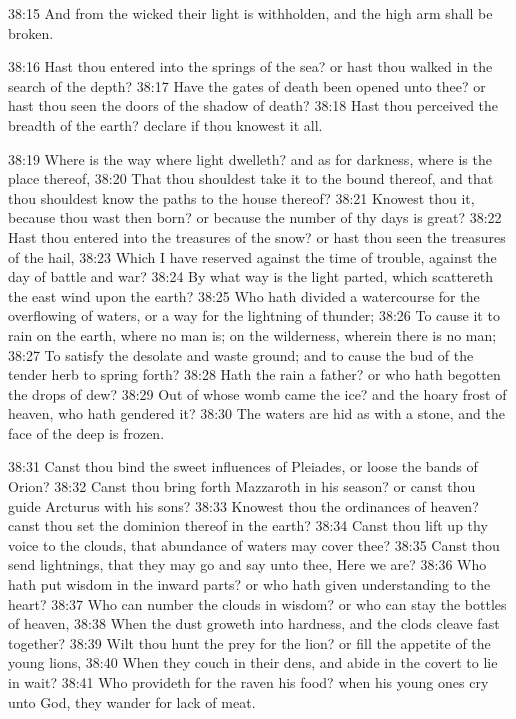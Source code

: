 38:15 And from the wicked their light is withholden, and the high arm
shall be broken.

38:16 Hast thou entered into the springs of the sea? or hast thou
walked in the search of the depth?  38:17 Have the gates of death been
opened unto thee? or hast thou seen the doors of the shadow of death?
38:18 Hast thou perceived the breadth of the earth? declare if thou
knowest it all.

38:19 Where is the way where light dwelleth? and as for darkness,
where is the place thereof, 38:20 That thou shouldest take it to the
bound thereof, and that thou shouldest know the paths to the house
thereof?  38:21 Knowest thou it, because thou wast then born? or
because the number of thy days is great?  38:22 Hast thou entered into
the treasures of the snow? or hast thou seen the treasures of the
hail, 38:23 Which I have reserved against the time of trouble, against
the day of battle and war?  38:24 By what way is the light parted,
which scattereth the east wind upon the earth?  38:25 Who hath divided
a watercourse for the overflowing of waters, or a way for the
lightning of thunder; 38:26 To cause it to rain on the earth, where no
man is; on the wilderness, wherein there is no man; 38:27 To satisfy
the desolate and waste ground; and to cause the bud of the tender herb
to spring forth?  38:28 Hath the rain a father? or who hath begotten
the drops of dew?  38:29 Out of whose womb came the ice? and the hoary
frost of heaven, who hath gendered it?  38:30 The waters are hid as
with a stone, and the face of the deep is frozen.

38:31 Canst thou bind the sweet influences of Pleiades, or loose the
bands of Orion?  38:32 Canst thou bring forth Mazzaroth in his season?
or canst thou guide Arcturus with his sons?  38:33 Knowest thou the
ordinances of heaven? canst thou set the dominion thereof in the
earth?  38:34 Canst thou lift up thy voice to the clouds, that
abundance of waters may cover thee?  38:35 Canst thou send lightnings,
that they may go and say unto thee, Here we are?  38:36 Who hath put
wisdom in the inward parts? or who hath given understanding to the
heart?  38:37 Who can number the clouds in wisdom? or who can stay the
bottles of heaven, 38:38 When the dust groweth into hardness, and the
clods cleave fast together?  38:39 Wilt thou hunt the prey for the
lion? or fill the appetite of the young lions, 38:40 When they couch
in their dens, and abide in the covert to lie in wait?  38:41 Who
provideth for the raven his food? when his young ones cry unto God,
they wander for lack of meat.

